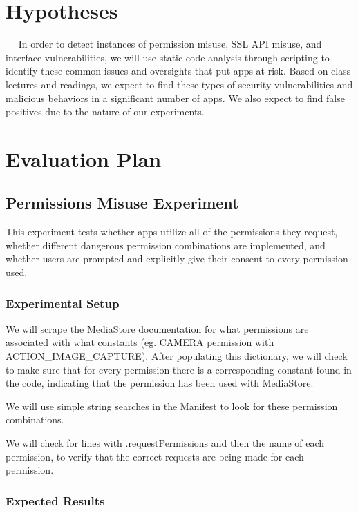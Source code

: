 \documentclass[10pt,twocolumn,pdftex]{article}
\begin{document}
\section{Hypotheses}


   In order to detect instances of permission misuse, SSL API misuse, and interface vulnerabilities, we will use static code analysis through scripting to identify these common issues and oversights that put apps at risk. Based on class lectures and readings, we expect to find these types of security vulnerabilities and malicious behaviors in a significant number of apps. We also expect to find false positives due to the nature of our experiments. 

\section{Evaluation Plan}


\subsection{Permissions Misuse Experiment}

    This experiment tests whether apps utilize all of the permissions they request, whether different dangerous permission combinations are implemented, and whether users are prompted and explicitly give their consent to every permission used.

    \subsubsection{Experimental Setup}
    We will scrape the MediaStore documentation for what permissions are associated with what constants (eg. CAMERA permission with ACTION\_IMAGE\_CAPTURE). After populating this dictionary, we will check to make sure that for every permission there is a corresponding constant found in the code, indicating that the permission has been used with MediaStore.

    We will use simple string searches in the Manifest to look for these permission combinations. 

    We will check for lines with .requestPermissions and then the name of each permission, to verify that the correct requests are being made for each permission.

    \subsubsection{Expected Results}
\end{document}
